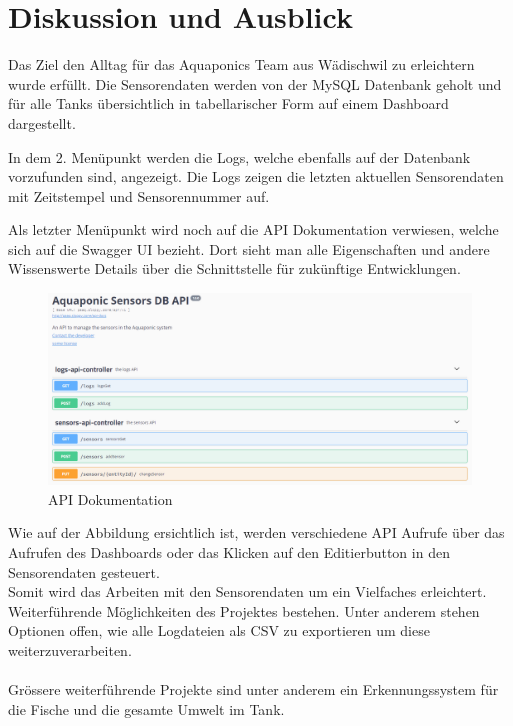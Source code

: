 \documentclass[../main.tex]{subfiles}
\begin{document}
	\section{Diskussion und Ausblick}
	
	Das Ziel den Alltag für das Aquaponics Team aus Wädischwil zu erleichtern wurde erfüllt.
	Die Sensorendaten werden von der MySQL Datenbank geholt und für alle Tanks übersichtlich in tabellarischer Form auf einem Dashboard dargestellt. \par \noindent
	In dem 2. Menüpunkt werden die Logs, welche ebenfalls auf der Datenbank vorzufunden sind, angezeigt. Die Logs zeigen die letzten aktuellen Sensorendaten mit Zeitstempel und Sensorennummer auf. \par \noindent
	Als letzter Menüpunkt wird noch auf die API Dokumentation verwiesen, welche sich auf die Swagger UI bezieht. Dort sieht man alle Eigenschaften und andere Wissenswerte Details über die Schnittstelle für zukünftige Entwicklungen.\par 
	\begin{figure}[h]
		\centering
		\includegraphics[scale=0.4]{../images/API_Documentation}
		\caption{API Dokumentation}
		\label{fig:API_Documentation}
	\end{figure}
	\noindent
	Wie auf der Abbildung ersichtlich ist, werden verschiedene API Aufrufe über das Aufrufen des Dashboards oder das Klicken auf den Editierbutton in den Sensorendaten gesteuert. 
	\\
	Somit wird das Arbeiten mit den Sensorendaten um ein Vielfaches erleichtert.
	\\
	Weiterführende Möglichkeiten des Projektes bestehen. Unter anderem stehen Optionen offen, wie alle Logdateien als CSV zu exportieren um diese weiterzuverarbeiten.
	\\ \\
	Grössere weiterführende Projekte sind unter anderem ein Erkennungssystem für die Fische und die gesamte Umwelt im Tank. \\
\end{document}
